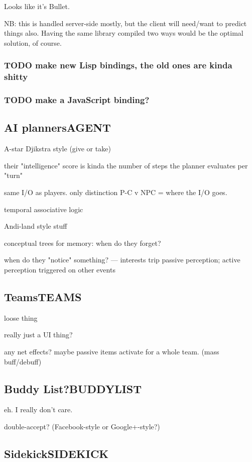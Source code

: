 \documentclass[11pt]{article}
\begin{document}
Looks like it's Bullet.

NB: this is handled server-side mostly, but the client will need/want
to predict things also. Having the same library compiled two ways
would be the optimal solution, of course.

\subsubsection{{\bfseries\sffamily TODO} make new Lisp bindings, the old ones are kinda shitty}
\label{sec-1-14-1}
\subsubsection{{\bfseries\sffamily TODO} make a JavaScript binding?}
\label{sec-1-14-2}
\subsection{AI planners\hfill{}\textsc{AGENT}}
\label{sec-1-15}

A-star Djikstra style (give or take)

their "intelligence"  score is kinda  the number of steps  the planner
evaluates per "turn"

same I/O as players. only distinction P-C v NPC = where the I/O goes.

temporal associative logic

Andi-land style stuff

conceptual trees for memory: when do they forget?

when  do   they  "notice"   something?  ---  interests   trip  passive
perception; active perception triggered on other events
\subsection{Teams\hfill{}\textsc{TEAMS}}
\label{sec-1-16}

loose thing

really just a UI thing?

any net effects? maybe passive items  activate for a whole team. (mass
buff/debuff)
\subsection{Buddy List?\hfill{}\textsc{BUDDYLIST}}
\label{sec-1-17}

eh. I really don't care.

double-accept? (Facebook-style or Google+-style?)
\subsection{Sidekick\hfill{}\textsc{SIDEKICK}}
\label{sec-1-18}
\end{document}
